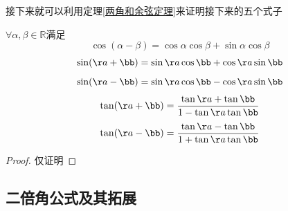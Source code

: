 接下来就可以利用定理\ref{两角和余弦定理}来证明接下来的五个式子
\begin{theorem}
    $\forall \alpha,\beta \in \mathbb{R} $满足
    \begin{equation}\label{两角差余弦}
        \cos(\alpha-\beta) = \cos \alpha\cos \beta +\sin \alpha\cos \beta  
    \end{equation}
    \begin{equation}\label{两角和正弦}
        \sin(\aa+\bb)=\sin\aa\cos\bb+\cos\aa\sin\bb
    \end{equation}
    \begin{equation}\label{两角差正弦}
        \sin(\aa-\bb)=\sin\aa\cos\bb-\cos\aa\sin\bb
    \end{equation}
    \begin{equation}\label{两角和正切}
        \tan(\aa+\bb)=\frac{\tan\aa+\tan\bb}{1-\tan\aa\tan\bb}
    \end{equation}
    \begin{equation}\label{两角差正切}
        \tan(\aa-\bb)=\frac{\tan\aa-\tan\bb}{1+\tan\aa\tan\bb}
    \end{equation}
\end{theorem}
\begin{proof}
仅证明
\end{proof}

\clearpage
\subsection{二倍角公式及其拓展}
\clearpage
